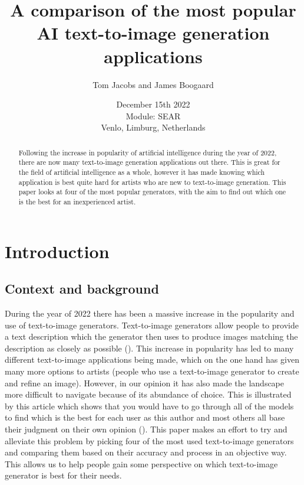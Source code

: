 \documentclass[]{report}
\title{A comparison of the most popular AI text-to-image generation applications}
\author{Tom Jacobs and James Boogaard}
\date{December 15th 2022 \\Module: SEAR \\Venlo, Limburg, Netherlands}
\begin{document}
	
	\maketitle
	
	\begin{abstract}
		Following the increase in popularity of artificial intelligence during the year of 2022, there are now many text-to-image generation applications out there. This is great for the field of artificial intelligence as a whole, however it has made knowing which application is best quite hard for artists who are new to text-to-image generation. This paper looks at four of the most popular generators, with the aim to find out which one is the best for an inexperienced artist.
		
		
	\end{abstract}
	
	\tableofcontents
	\setcounter{page}{3}
	\listoffigures %
	\pagebreak
	
	
	\section{Introduction}
	
	\subsection{Context and background}
	During the year of 2022 there has been a massive increase in the popularity and use of text-to-image generators. Text-to-image generators allow people to provide a text description which the generator then uses to produce images matching the description as closely as possible (\cite{whatIsTextToImageGen}). This increase in popularity has led to many different text-to-image applications being made, which on the one hand has given many more options to artists (people who use a text-to-image generator to create and refine an image). However, in our opinion it has also made the landscape more difficult to navigate because of its abundance of choice. This is illustrated by this article which shows that you would have to go through all of the models to find which is the best for each user as this author and most others all base their judgment on their own opinion (\cite{whyUseImageComp}). This paper makes an effort to try and alleviate this problem by picking four of the most used text-to-image generators and comparing them based on their accuracy and process in an objective way. This allows us to help people gain some perspective on which text-to-image generator is best for their needs.
	
\end{document}
